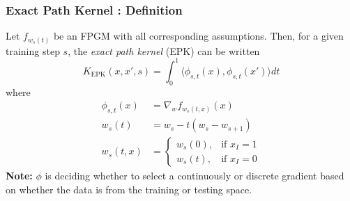 \begin{frame}
  \frametitle{Exact Path Kernel : Definition}
 \begin{definition}
 \label{epk}

 Let $f_{w_s(t)}$ be an FPGM with all corresponding assumptions. Then, for a given training step $s$, the \emph{exact path kernel} (EPK) can be written  
 \begin{equation}
  K_{\text{EPK}}(x, x', s) = \int_0^1\langle \phi_{s,t}(x), \phi_{s,t}(x')\rangle dt
  \label{eq2}
 \end{equation}
 where
 \begin{align}
 \phi_{s, t}(x) &=  \nabla_w f_{w_s(t,x)} (x)\\
 w_s(t) &= w_s - t(w_s - w_{s+1})\\
 w_s(t,x) &= \begin{cases} w_s(0), & \text{if } x_I = 1\\ w_s(t), & \text{if } x_I = 0 \end{cases}
 \end{align}
 \textbf{Note:} $\phi$ is deciding whether to select a continuously or
 discrete gradient based on whether the data is from the training or
 testing space.

 \end{definition}
\end{frame}
